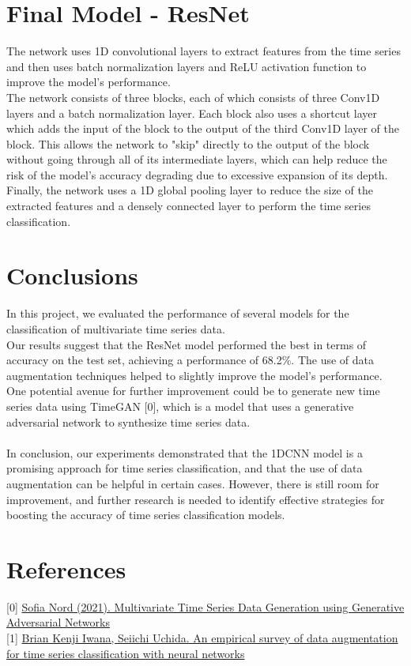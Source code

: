 \documentclass[11pt, oneside]{article}
\begin{document}
\section{Final Model - ResNet}
The network uses 1D convolutional layers to extract features from the time series and then uses batch normalization layers and ReLU activation function to improve the model's performance.\\
The network consists of three blocks, each of which consists of three Conv1D layers and a batch normalization layer. Each block also uses a shortcut layer which adds the input of the block to the output of the third Conv1D layer of the block. This allows the network to "skip" directly to the output of the block without going through all of its intermediate layers, which can help reduce the risk of the model's accuracy degrading due to excessive expansion of its depth.
Finally, the network uses a 1D global pooling layer to reduce the size of the extracted features and a densely connected layer to perform the time series classification.
\section{Conclusions}
In this project, we evaluated the performance of several models for the classification of multivariate time series data.\\
Our results suggest that the ResNet model performed the best in terms of accuracy on the test set, achieving a performance of 68.2\%. The use of data augmentation techniques helped to slightly improve the model's performance. One potential avenue for further improvement could be to generate new time series data using TimeGAN [0], which is a model that uses a generative adversarial network to synthesize time series data.\\\\
In conclusion, our experiments demonstrated that the 1DCNN model is a promising approach for time series classification, and that the use of data augmentation can be helpful in certain cases. However, there is still room for improvement, and further research is needed to identify effective strategies for boosting the accuracy of time series classification models.
\section*{References}
[0] \href{http://kth.diva-portal.org/smash/get/diva2:1598158/FULLTEXT01.pdf}{Sofia Nord (2021). Multivariate Time Series Data
Generation using Generative
Adversarial Networks
}\\
{[1]} \href{https://journals.plos.org/plosone/article?id=10.1371/journal.pone.0254841}{Brian Kenji Iwana, Seiichi Uchida. An empirical survey of data augmentation for time series classification with neural networks}
\end{document}
